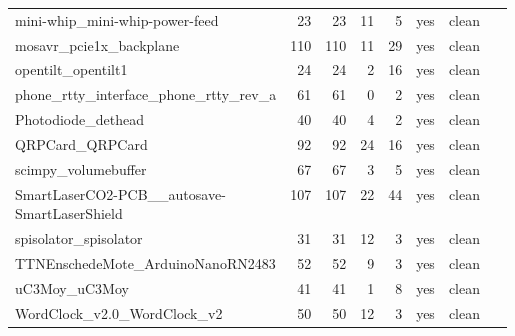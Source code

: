 \begin{longtable}{@{}p{0.36\linewidth}rrrrcp{0.22\linewidth}@{}}
mini-\allowbreak{}whip\_\allowbreak{}mini-\allowbreak{}whip-\allowbreak{}power-\allowbreak{}feed & 23 & 23 & 11 & 5 & \textcolor{fraqua}{yes} & {\footnotesize clean} \\
mosavr\_\allowbreak{}pcie1x\_\allowbreak{}backplane & 110 & 110 & 11 & 29 & \textcolor{fraqua}{yes} & {\footnotesize clean} \\
opentilt\_\allowbreak{}opentilt1 & 24 & 24 & 2 & 16 & \textcolor{fraqua}{yes} & {\footnotesize clean} \\
phone\_\allowbreak{}rtty\_\allowbreak{}interface\_\allowbreak{}phone\_\allowbreak{}rtty\_\allowbreak{}rev\_\allowbreak{}a & 61 & 61 & 0 & 2 & \textcolor{fraqua}{yes} & {\footnotesize clean} \\
Photodiode\_\allowbreak{}dethead & 40 & 40 & 4 & 2 & \textcolor{fraqua}{yes} & {\footnotesize clean} \\
QRPCard\_\allowbreak{}QRPCard & 92 & 92 & 24 & 16 & \textcolor{fraqua}{yes} & {\footnotesize clean} \\
scimpy\_\allowbreak{}volumebuffer & 67 & 67 & 3 & 5 & \textcolor{fraqua}{yes} & {\footnotesize clean} \\
SmartLaserCO2-\allowbreak{}PCB\_\allowbreak{}\_\allowbreak{}autosave-\allowbreak{}SmartLaserShield & 107 & 107 & 22 & 44 & \textcolor{fraqua}{yes} & {\footnotesize clean} \\
spisolator\_\allowbreak{}spisolator & 31 & 31 & 12 & 3 & \textcolor{fraqua}{yes} & {\footnotesize clean} \\
TTNEnschedeMote\_\allowbreak{}ArduinoNanoRN2483 & 52 & 52 & 9 & 3 & \textcolor{fraqua}{yes} & {\footnotesize clean} \\
uC3Moy\_\allowbreak{}uC3Moy & 41 & 41 & 1 & 8 & \textcolor{fraqua}{yes} & {\footnotesize clean} \\
WordClock\_\allowbreak{}v2.0\_\allowbreak{}WordClock\_\allowbreak{}v2 & 50 & 50 & 12 & 3 & \textcolor{fraqua}{yes} & {\footnotesize clean} \\
\bottomrule\end{longtable}
